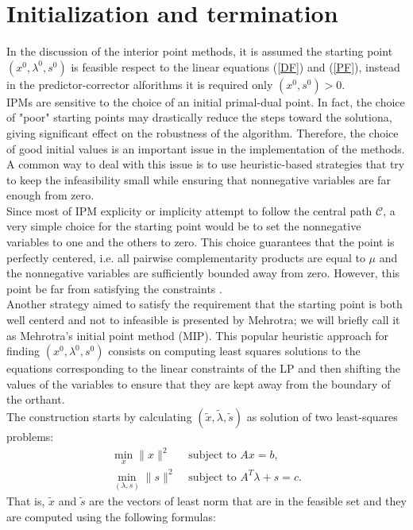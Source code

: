 \documentclass[a4paper,10 pt,titlepage,twoside]{book}
\theoremstyle{plain}
\theoremstyle{definition}
\theoremstyle{remark}
\begin{document}
\section*{Initialization and termination}
In the discussion of the interior point methods, it is assumed the starting point $(x^{0}, \lambda^{0}, s^{0})$ is feasible respect to the linear equations (\ref{DF}) and (\ref{PF}), instead in the predictor-corrector alforithms it is required only $(x^{0},s^{0})>0$.\\
IPMs are sensitive to the choice of an initial primal-dual point. In fact, the choice of "poor" starting points may drastically reduce the steps toward the solutiona, giving significant effect on the robustness of the algorithm. Therefore, the choice of good initial values is an important issue in the implementation of the methods. A common way to deal with this issue is to use heuristic-based strategies that try to keep the infeasibility small while ensuring that nonnegative variables are far enough from zero.\\
Since most of IPM explicity or implicity attempt to follow the central path $\mathcal{C}$, a very simple choice for the starting point would be to set the nonnegative variables to one and the others to zero. This choice guarantees that the point is perfectly centered, i.e. all pairwise complementarity products are equal to $\mu$ and the nonnegative variables are sufficiently bounded away from zero. However, this point be far from satisfying the constraints \cite{VAN}.\\
Another strategy aimed to satisfy the requirement that the starting point is both well centerd and not to infeasible is presented \cite{MER} by Mehrotra; we will briefly call it as Mehrotra's initial point method (MIP). This popular heuristic approach for finding $(x^{0}, \lambda^{0}, s^{0})$ consists on computing least squares solutions to the equations corresponding to the linear constraints of the LP and then shifting the values of the variables to ensure that they are kept away from the boundary of the orthant. \\
The construction starts by calculating $(\tilde{x}, \tilde{\lambda}, \tilde{s})$ as solution of two least-squares problems:
\begin{align*}
\min\limits_{x} \lVert x \rVert ^{2} &\text{ subject to }Ax = b,\\
\min\limits_{(\lambda,s)} \lVert s \rVert ^{2} &\text{ subject to } A^{T}\lambda +s = c.
\end{align*}
That is, $\tilde{x}$ and $\tilde{s}$ are the vectors of least norm that are in the feasible set and they are computed using the following formulas:
\end{document}
